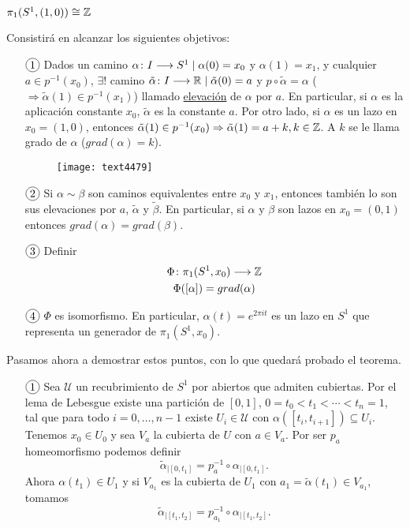 \documentclass[GTS.tex]{subfiles}
\begin{document}
\begin{teorema}
$\pi_1(S^1,(1,0))\cong\mathbb{Z}$
\end{teorema}

\begin{dem}Consistirá en alcanzar los siguientes objetivos:
\begin{enumerate}
\item[$\circled{1}$] Dados un camino $\alpha\colon{I}\longrightarrow{S^1}\mid\alpha(0)=x_0$ y $\alpha(1)=x_1$, y cualquier $a\in p^{-1}(x_0)$, $\exists!$ camino $\tilde{\alpha}\colon{I}\longrightarrow{\mathbb{R}}\mid\tilde{\alpha}(0)=a$ y $p\circ\tilde{\alpha}=\alpha$ ($\Rightarrow \tilde{\alpha}(1)\in p^{-1}(x_1)$) llamado \underline{elevación} de $\alpha$ por $a$. En particular, si $\alpha$ es la aplicación constante $x_0$, $\tilde{\alpha}$ es la constante $a$. Por otro lado, si $\alpha$ es un lazo en $x_0=(1,0)$, entonces $\tilde{\alpha}(1)\in p^{-1}(x_0)\Rightarrow\tilde{\alpha}(1)=a+k, k\in\mathbb{Z}$. A $k$ se le llama grado de $\alpha$ ($grad(\alpha)=k$).

\begin{figure}[h!]
	\texttt{[image: text4479]}
\end{figure}

\item[$\circled{2}$] Si $\alpha\sim\beta$ son caminos equivalentes entre $x_0$ y $x_1$, entonces también lo son sus elevaciones por $a$, $\tilde{\alpha}$ y $\tilde{\beta}$. En particular, si $\alpha$ y $\beta$ son lazos en $x_0=(0,1)$ entonces $grad(\alpha)=grad(\beta)$.
\item[$\circled{3}$] Definir
\begin{gather*}
\Phi\colon{\pi_1(S^1,x_0)}\longrightarrow{\mathbb{Z}}\\
\Phi([\alpha])=grad(\alpha)
\end{gather*}
\item[$\circled{4}$] $\Phi$ es isomorfismo. En particular, $\alpha(t)=e^{2\pi it}$ es un lazo en $S^1$ que representa un generador de $\pi_1(S^1,x_0)$.
\end{enumerate}
Pasamos ahora a demostrar estos puntos, con lo que quedará probado el teorema.
\begin{enumerate}
\item[$\circled{1}$] Sea $\mathcal{U}$ un recubrimiento de $S^1$ por abiertos que admiten cubiertas. Por el lema de Lebesgue existe una partición de $[0,1]$, $0=t_0<t_1<\cdots<t_n=1$,  tal que para todo $i=0,\dots, n-1$ existe $U_i\in\mathcal{U}$ con  $\alpha([t_i,t_{i+1}])\subseteq U_i$. Tenemos $x_0\in U_0$ y sea $V_a$ la cubierta de $U$ con $a\in V_a$. Por ser $p_a$ homeomorfismo podemos definir
\[
\tilde{\alpha}_{\big|{[0,t_1]}}=p_a^{-1}\circ\alpha_{\big|[0,t_1]}.
\]
Ahora $\alpha(t_1)\in U_1$ y si $V_{a_1}$ es la cubierta de $U_1$ con $a_1=\tilde{\alpha}(t_1)\in V_{a_1}$, tomamos
\[
\tilde{\alpha}_{\big|{[t_1,t_2]}}=p_{a_1}^{-1}\circ\alpha_{\big|[t_1,t_2]}.
\]


\end{enumerate}
\end{dem}
\end{document}
